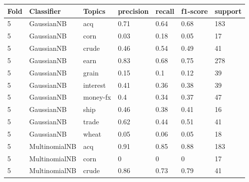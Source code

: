 \documentclass{article}
\begin{document}
\begin{table}[h]
\begin{tabular}{lllllll}
\textbf{Fold} & \textbf{Classifier}    & \textbf{Topics} & \textbf{precision} & \textbf{recall} & \textbf{f1-score} & \textbf{support} \\ \hline
5             & GaussianNB             & acq             & 0.71               & 0.64            & 0.68              & 183              \\
5             & GaussianNB             & corn            & 0.03               & 0.18            & 0.05              & 17               \\
5             & GaussianNB             & crude           & 0.46               & 0.54            & 0.49              & 41               \\
5             & GaussianNB             & earn            & 0.83               & 0.68            & 0.75              & 278              \\
5             & GaussianNB             & grain           & 0.15               & 0.1             & 0.12              & 39               \\
5             & GaussianNB             & interest        & 0.41               & 0.36            & 0.38              & 39               \\
5             & GaussianNB             & money-fx        & 0.4                & 0.34            & 0.37              & 47               \\
5             & GaussianNB             & ship            & 0.46               & 0.38            & 0.41              & 16               \\
5             & GaussianNB             & trade           & 0.62               & 0.44            & 0.51              & 41               \\
5             & GaussianNB             & wheat           & 0.05               & 0.06            & 0.05              & 18               \\
5             & MultinomialNB          & acq             & 0.91               & 0.85            & 0.88              & 183              \\
5             & MultinomialNB          & corn            & 0                  & 0               & 0                 & 17               \\
5             & MultinomialNB          & crude           & 0.86               & 0.73            & 0.79              & 41               \\

\end{tabular}
\end{table}
\end{document}
